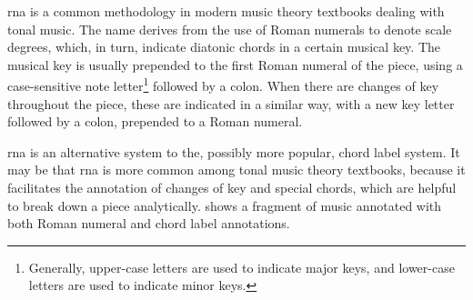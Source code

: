 

\gls{rna} is a common methodology in modern music theory
textbooks dealing with tonal music. The name derives from
the use of Roman numerals to denote scale degrees, which, in
turn, indicate diatonic chords in a certain musical key. The
musical key is usually prepended to the first Roman numeral
of the piece, using a case-sensitive note
letter\footnote{Generally, upper-case letters are used to
indicate major keys, and lower-case letters are used to
indicate minor keys.} followed by a colon. When there are
changes of key throughout the piece, these are indicated in
a similar way, with a new key letter followed by a colon,
prepended to a Roman numeral.

\gls{rna} is an alternative system to the, possibly more
popular, chord label system. It may be that \gls{rna} is
more common among tonal music theory textbooks, because it
facilitates the annotation of changes of key and special
chords, which are helpful to break down a piece
analytically.  shows a fragment of music
annotated with both Roman numeral and chord label
annotations.

